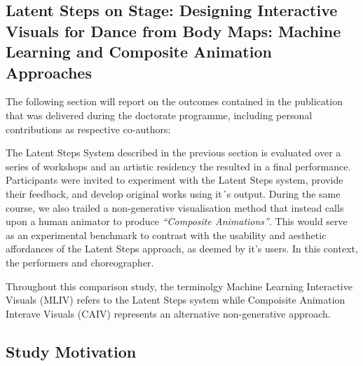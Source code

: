 \subsection[Designing Interactive Visuals from Body Maps]{Latent Steps on Stage: Designing Interactive Visuals for Dance from Body Maps: Machine Learning and Composite Animation Approaches}
\label{case_studies:modi_dis}

The following section will report on the outcomes contained in the publication that was delivered during the doctorate programme, including personal contributions as respective co-authors:


The Latent Steps System described in the previous section is evaluated over a series of workshops and an artistic residency the resulted in a final performance. Participants were invited to experiment with the Latent Steps system, provide their feedback, and develop original works using it´s output. During the same course, we also trailed a non-generative visualisation method that instead calls upon a human animator to produce \textit{``Composite Animations''}. This would serve as an experimental benchmark to contrast with the usability and aesthetic affordances of the Latent Steps approach, as deemed by it's users. In this context, the performers and choreographer.

Throughout this comparison study, the terminolgy Machine Learning Interactive Visuals (MLIV) refers to the Latent Steps system while Compoisite Animation Interave Visuals (CAIV) represents an alternative non-generative approach.

\subsection{Study Motivation}

